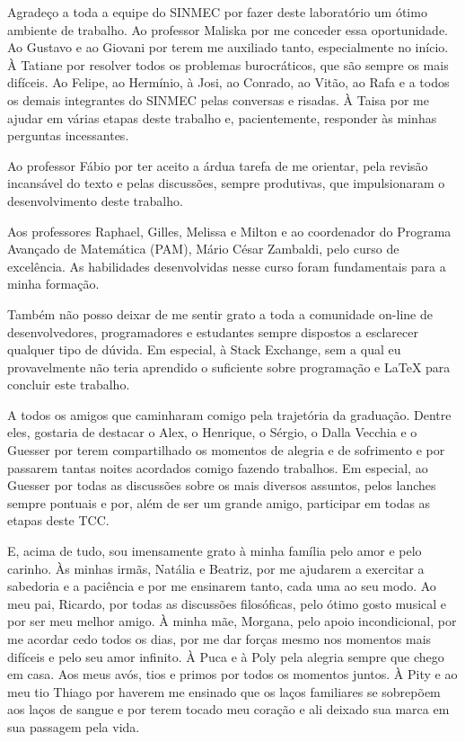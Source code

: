 \begin{agradecimentos}
	Agradeço a toda a equipe do SINMEC por fazer deste laboratório um ótimo ambiente de trabalho. Ao professor Maliska por me conceder essa oportunidade. Ao Gustavo e ao Giovani por terem me auxiliado tanto, especialmente no início. À Tatiane por resolver todos os problemas burocráticos, que são sempre os mais difíceis. Ao Felipe, ao Hermínio, à Josi, ao Conrado, ao Vitão, ao Rafa e a todos os demais integrantes do SINMEC pelas conversas e risadas. À Taisa por me ajudar em várias etapas deste trabalho e, pacientemente, responder às minhas perguntas incessantes.

	Ao professor Fábio por ter aceito a árdua tarefa de me orientar, pela revisão incansável do texto e pelas discussões, sempre produtivas, que impulsionaram o desenvolvimento deste trabalho.

	Aos professores Raphael, Gilles, Melissa e Milton e ao coordenador do Programa Avançado de Matemática (PAM), Mário César Zambaldi, pelo curso de excelência. As habilidades desenvolvidas nesse curso foram fundamentais para a minha formação.

	Também não posso deixar de me sentir grato a toda a comunidade on-line de desenvolvedores, programadores e estudantes sempre dispostos a esclarecer qualquer tipo de dúvida. Em especial, à Stack Exchange, sem a qual eu provavelmente não teria aprendido o suficiente sobre programação e \LaTeX{} para concluir este trabalho.

	A todos os amigos que caminharam comigo pela trajetória da graduação. Dentre eles, gostaria de destacar o Alex, o Henrique, o Sérgio, o Dalla Vecchia e o Guesser por terem compartilhado os momentos de alegria e de sofrimento e por passarem tantas noites acordados comigo fazendo trabalhos. Em especial, ao Guesser por todas as discussões sobre os mais diversos assuntos, pelos lanches sempre pontuais e por, além de ser um grande amigo, participar em todas as etapas deste TCC.

	E, acima de tudo, sou imensamente grato à minha família pelo amor e pelo carinho. Às minhas irmãs, Natália e Beatriz, por me ajudarem a exercitar a sabedoria e a paciência e por me ensinarem tanto, cada uma ao seu modo. Ao meu pai, Ricardo, por todas as discussões filosóficas, pelo ótimo gosto musical e por ser meu melhor amigo. À minha mãe, Morgana, pelo apoio incondicional, por me acordar cedo todos os dias, por me dar forças mesmo nos momentos mais difíceis e pelo seu amor infinito. À Puca e à Poly pela alegria sempre que chego em casa. Aos meus avós, tios e primos por todos os momentos juntos. À Pity e ao meu tio Thiago por haverem me ensinado que os laços familiares se sobrepõem aos laços de sangue e por terem tocado meu coração e ali deixado sua marca em sua passagem pela vida.
\end{agradecimentos}